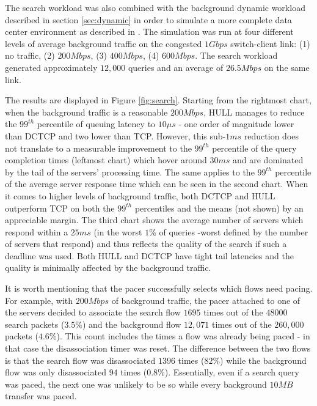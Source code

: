 \documentclass[10pt,conference,compsocconf]{IEEEtran}
\begin{document}
The search workload was also combined with the background dynamic workload described in section \ref{sec:dynamic} in order to simulate a more complete data center environment as described in \cite{DCTCP}. The simulation was run at four different levels of average background traffic on the congested $1Gbps$ switch-client link: (1) no traffic, (2) $200Mbps$, (3) $400Mbps$, (4) $600Mbps$. The search workload generated approximately $12,000$ queries and an average of $26.5Mbps$ on the same link. 

The results are displayed in Figure \ref{fig:search}. Starting from the rightmost chart, when the background traffic is a reasonable $200Mbps$, HULL manages to reduce the $99^{th}$ percentile of queuing latency to $10\mu s$ - one order of magnitude lower than DCTCP and two lower than TCP. However, this sub-$1ms$ reduction does not translate to a measurable improvement to the $99^{th}$ percentile of the query completion times (leftmost chart) which hover around $30ms$ and are dominated by the tail of the servers' processing time. The same applies to the $99^{th}$ percentile of the average server response time which can be seen in the second chart. When it comes to higher levels of background traffic, both DCTCP and HULL outperform TCP on both the $99^{th}$ percentiles and the means (not shown) by an appreciable margin. The third chart shows the average number of servers which respond within a $25 ms$ (in the worst $1\%$ of queries -worst defined by the number of servers that respond) and thus reflects the quality of the search if such a deadline was used. Both HULL and DCTCP have tight tail latencies and the quality is minimally affected by the background traffic.


It is worth mentioning that the pacer successfully selects which flows need pacing. For example, with $200Mbps$ of background traffic, the pacer attached to one of the servers decided to associate the search flow $1695$ times out of the $48000$ search packets ($3.5\%$) and the background flow $12,071$ times out of the $260,000$ packets ($4.6\%$). This count includes the times a flow was already being paced - in that case the disassociation timer was reset. The difference between the two flows is that the search flow was disassociated $1396$ times ($82\%$) while the background flow was only disassociated $94$ times ($0.8\%$). Essentially, even if a search query was paced, the next one was unlikely to be so while every background $10MB$ transfer was paced.
\end{document}
